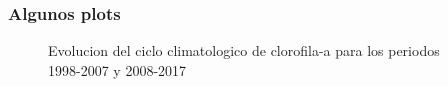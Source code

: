 \documentclass{beamer}
\begin{document}
\begin{frame}
	
	\frametitle{Algunos plots}
	\begin{figure}
	\caption{Evolucion del ciclo climatologico de clorofila-a para los periodos 1998-2007 y 2008-2017}	
	\end{figure}
	
\end{frame}
\end{document}
